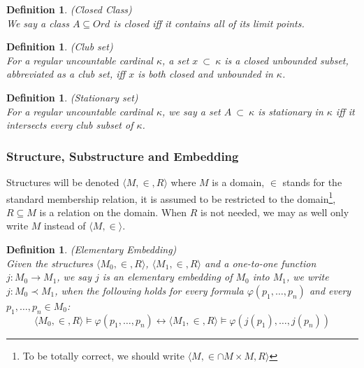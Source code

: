 \documentclass[12pt,a4paper]{article}
\newtheorem{definition}[theorem]{Definition}
\renewcommand{\iff}{\leftrightarrow}
\newcommand{\then}{\rightarrow}
\begin{document}
\begin{definition}{(Closed Class)}\label{def:closed_class}\\
We say a class $A \subseteq Ord$ is closed iff it contains all of its limit points.
\end{definition}

\begin{definition}{(Club set)}\label{def:club_set}\\
For a regular uncountable cardinal $\kappa$, a set $x\ \subset\ \kappa$ is a \emph{closed unbounded} subset, abbreviated as a \emph{club set}, iff $x$ is both closed and unbounded in $\kappa$.
\end{definition}

\begin{definition}{(Stationary set)}\label{def:stationary_set}\\
For a regular uncountable cardinal $\kappa$, we say a set $A\ \subset\ \kappa$ is stationary in $\kappa$ iff it intersects every club subset of $\kappa$.
\end{definition}

\subsubsection{Structure, Substructure and Embedding}

Structures will be denoted $\langle M, \in, R \rangle$ where $M$ is a domain, $\in$ stands for the standard membership relation, it is assumed to be restricted to the domain\footnote{To be totally correct, we should write $\langle M, \in \cap M \times M, R \rangle$}, $R \subseteq M$ is a relation on the domain. When $R$ is not needed, we may as well only write $M$ instead of $\langle M, \in \rangle$.

\begin{definition}{(Elementary Embedding)}\label{def:elementary_embedding}\\
Given the structures $\langle M_0, \in, R \rangle$, $\langle M_1, \in, R \rangle$ and a one-to-one function $j: M_0 \then M_1$, we say $j$ is an \emph{elementary embedding} of $M_0$ into $M_1$, we write $j: M_0 \prec M_1$, when the following holds for every formula $\varphi(p_1, \ldots, p_n)$ and every $p_1, \ldots, p_n \in M_0$:
\begin{equation}
\langle M_0, \in, R \rangle \models \varphi(p_1, \ldots, p_n) \iff \langle M_1, \in, R \rangle  \models \varphi(j(p_1), \ldots, j(p_n))
\end{equation}
\end{definition}
\end{document}

